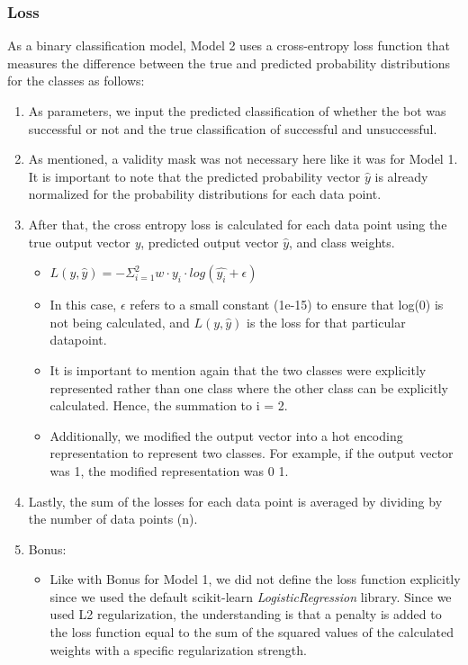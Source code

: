 \documentclass[11pt]{article}
\begin{document}
\subsubsection{Loss}
As a binary classification model, Model 2 uses a cross-entropy loss function that measures the difference between the true and predicted probability distributions for the classes as follows: 
\begin{enumerate}
    \item As parameters, we input the predicted classification of whether the bot was successful or not and the true classification of successful and unsuccessful. 
    \item As mentioned, a validity mask was not necessary here like it was for Model 1. It is important to note that the predicted probability vector $\hat{y}$ is already normalized for the probability distributions for each data point. 
    \item After that, the cross entropy loss is calculated for each data point using the true output vector \emph{y}, predicted output vector  $\hat{y}$, and class weights. 
    \begin{itemize}
        \item $L(y, \hat{y}) = - \Sigma_{i=1}^{2} w \cdot y_i \cdot log(\hat{y_i} + \epsilon)$
        \item In this case, $\epsilon$ refers to a small constant (1e-15) to ensure that log(0) is not being calculated, and $L(y,\hat{y})$ is the loss for that particular datapoint. 
        \item It is important to mention again that the two classes were explicitly represented rather than one class where the other class can be explicitly calculated. Hence, the summation to i = 2. 
        \item Additionally, we modified the output vector into a hot encoding representation to represent two classes. For example, if the output vector was 1, the modified representation was 0 1. 
    \end{itemize}
    \item Lastly, the sum of the losses for each data point is averaged by dividing by the number of data points (n). 
    \item Bonus:
    \begin{itemize}
        \item Like with Bonus for Model 1, we did not define the loss function explicitly since we used the default scikit-learn \emph{LogisticRegression} library. Since we used L2 regularization, the understanding is that a penalty is added to the loss function equal to the sum of the squared values of the calculated weights with a specific regularization strength.
    \end{itemize}
\end{enumerate}
\end{document}
